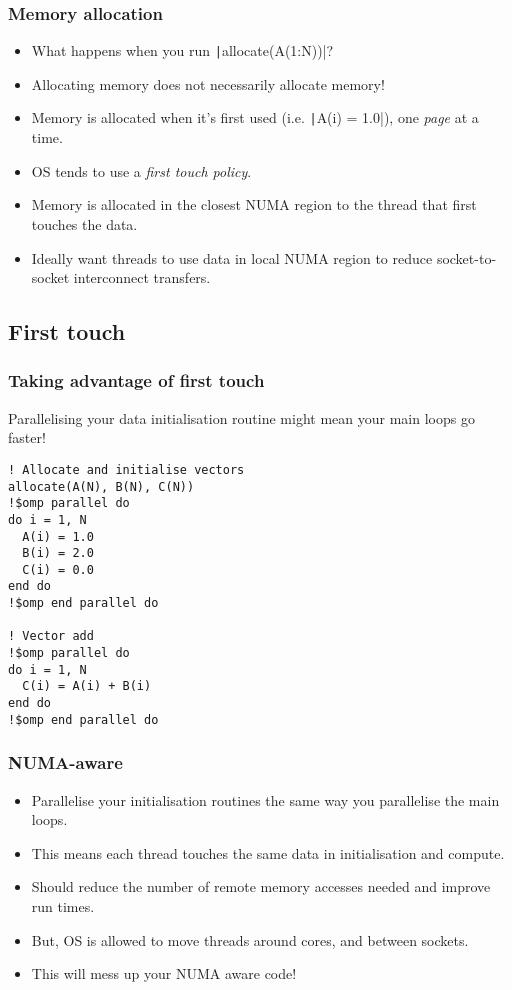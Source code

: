 \documentclass{beamer}
\begin{document}
\begin{frame}
\frametitle{Memory allocation}
\begin{itemize}
  \item What happens when you run \texttt|allocate(A(1:N))|?
  \pause
  \item Allocating memory does not necessarily allocate memory!
  \item Memory is allocated when it's first used (i.e. \texttt|A(i) = 1.0|), one \emph{page} at a time.
  \item OS tends to use a \emph{first touch policy}.
  \item Memory is allocated in the closest NUMA region to the thread that first touches the data.
  \item Ideally want threads to use data in local NUMA region to reduce socket-to-socket interconnect transfers.
\end{itemize}
\end{frame}

\subsection{First touch}
\begin{frame}[fragile]
\frametitle{Taking advantage of first touch}
Parallelising your data initialisation routine might mean your main loops go faster!


\begin{verbatim}
! Allocate and initialise vectors
allocate(A(N), B(N), C(N))
!$omp parallel do
do i = 1, N
  A(i) = 1.0
  B(i) = 2.0
  C(i) = 0.0
end do
!$omp end parallel do

! Vector add
!$omp parallel do
do i = 1, N
  C(i) = A(i) + B(i)
end do
!$omp end parallel do
\end{verbatim}

\end{frame}

\begin{frame}
\frametitle{NUMA-aware}
\begin{itemize}
  \item Parallelise your initialisation routines the same way you parallelise the main loops.
  \item This means each thread touches the same data in initialisation and compute.
  \item Should reduce the number of remote memory accesses needed and improve run times.
  \item But, OS is allowed to move threads around cores, and between sockets.
  \item This will mess up your NUMA aware code!
\end{itemize}
\end{frame}
\end{document}
